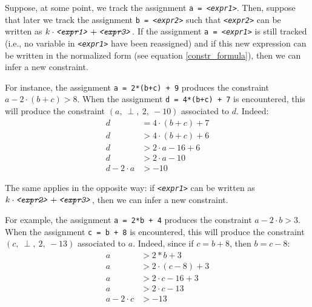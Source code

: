 \documentclass{article}
\newcounter{subsubsubsection}[subsubsection]
\newcommand{\spc}{\:}
\newcommand{\plchold}[1]{\texttt{\textit{<#1>}}}
\begin{document}
\label{common_expressions}
Suppose, at some point, we track the assignment \texttt{a = \plchold{expr1}}. Then, suppose that later we track the assignment \texttt{b = \plchold{expr2}} such that \plchold{expr2} can be written as $k \cdot \plchold{expr1} + \plchold{expr3}$. If the assignment \texttt{a = \plchold{expr1}} is still tracked (i.e., no variable in \plchold{expr1} have been reassigned) and if this new expression can be written in the normalized form (see equation \ref{constr_formula}), then we can infer a new constraint.

For instance, the assignment \texttt{a = 2*(b+c) + 9} produces the constraint $a - 2\cdot (b+c) > 8$. When the assignment \texttt{d = 4*(b+c) + 7} is encountered, this will produce the constraint $(a,\spc \perp,\spc 2, \spc -10)$ associated to $d$. Indeed:
\begin{align*}
    d &= 4 \cdot (b+c) + 7\\
    d &> 4 \cdot (b+c) + 6\\
    d &> 2 \cdot a - 16 +6\\ %
    d &> 2 \cdot a -10\\
    d - 2 \cdot a &> -10
\end{align*}


The same applies in the opposite way: if \plchold{expr1} can be written as $k \cdot \plchold{expr2} + \plchold{expr3}$, then we can infer a new constraint.

For example, the assignment \texttt{a = 2*b + 4} produces the constraint $a - 2\cdot b > 3$. When the assignment \texttt{c = b + 8} is encountered, this will produce the constraint $(c,\spc \perp,\spc 2, \spc -13)$ associated to $a$. Indeed, since if $c = b+8$, then $b=c-8$:
\begin{align*}
    a &> 2*b + 3\\
    a &> 2\cdot (c-8)+3\\
    a &> 2\cdot c - 16 + 3\\
    a &> 2 \cdot c -13\\
    a - 2 \cdot c &> -13
\end{align*}
\end{document}
